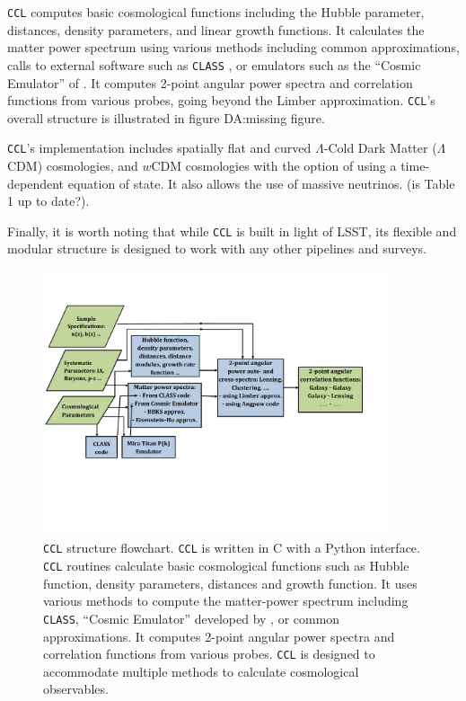\documentclass[\docopts]{\docclass}
\newcommand{\damonge}[1]{\textcolor{green!55!blue}{DA:#1}}
\newcommand{\ccl}{{\tt CCL}\xspace}
\begin{document}
\ccl computes basic cosmological functions including the Hubble parameter, distances, density parameters, and linear growth functions. It calculates the matter power spectrum using various methods including common approximations, calls to external software such as {\tt CLASS} \citep{class}, or emulators such as the ``Cosmic Emulator'' of \citet{Lawrence17}. It computes 2-point angular power spectra and correlation functions from various probes, going beyond the Limber approximation. \ccl 's overall structure is illustrated in figure \damonge{missing figure}.%

\ccl 's implementation includes spatially flat and curved $\Lambda$-Cold Dark Matter ($\Lambda$CDM) cosmologies, and $w$CDM cosmologies with the option of using a time-dependent equation of state. It also allows the use of massive neutrinos. (is Table 1 up to date?). 

Finally, it is worth noting that while \ccl is built in light of LSST, its flexible and modular structure is designed to work with any other pipelines and surveys.  

\begin{figure}
\centering
\includegraphics[width=0.9\textwidth]{CCL_Flowchart3}
\caption{\ccl structure flowchart. \ccl is written in C with a Python interface. \ccl routines calculate basic cosmological functions such as Hubble function, density parameters, distances and growth function. It uses various methods to compute the matter-power spectrum including {\tt CLASS}, ``Cosmic Emulator'' developed by \citet{Lawrence17}, or common approximations. It computes 2-point angular power spectra and correlation functions from various probes. \ccl is designed to accommodate multiple methods to calculate cosmological observables.}
\label{fig:CCL_structure}
\end{figure}
\end{document}
